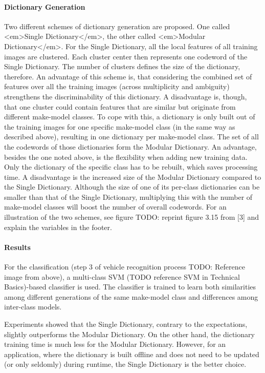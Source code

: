 \paragraph{Dictionary Generation}
Two different schemes of dictionary generation are proposed. One called <em>Single Dictionary</em>, the other called <em>Modular Dictionary</em>. For the Single Dictionary, all the local features of all training images are clustered. Each cluster center then represents one codeword of the Single Dictionary. The number of clusters defines the size of the dictionary, therefore. An advantage of this scheme is, that considering the combined set of features over all the training images (across multiplicity and ambiguity) strengthens the discriminability of this dictionary. A disadvantage is, though, that one cluster could contain features that are similar but originate from different make-model classes. To cope with this, a dictionary is only built out of the training images for one specific make-model class (in the same way as described above), resulting in one dictionary per make-model class. The set of all the codewords of those dictionaries form the Modular Dictionary. An advantage, besides the one noted above, is the flexibility when adding new training data. Only the dictionary of the specific class has to be rebuilt, which saves processing time. A disadvantage is the increased size of the Modular Dictionary compared to the Single Dictionary. Although the size of one of its per-class dictionaries can be smaller than that of the Single Dictionary, multiplying this with the number of make-model classes will boost the number of overall codewords. For an illustration of the two schemes, see figure TODO: reprint figure 3.15 from [3] and explain the variables in the footer.

\paragraph{Results}
For the classification (step 3 of vehicle recognition process TODO: Reference image from above), a multi-class SVM (TODO reference SVM in Technical Basics)-based classifier is used. The classifier is trained to learn both similarities among different generations of the same make-model class and differences among inter-class models.

Experiments showed that the Single Dictionary, contrary to the expectations, slightly outperforms the Modular Dictionary. On the other hand, the dictionary training time is much less for the Modular Dictionary. However, for an application, where the dictionary is built offline and does not need to be updated (or only seldomly) during runtime, the Single Dictionary is the better choice.

